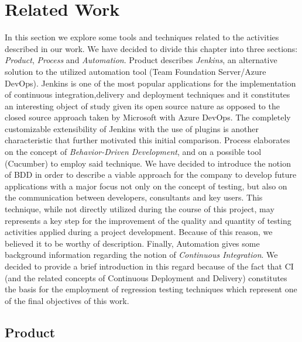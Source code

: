 \chapter{Related Work}

In this section we explore some tools and techniques related to the activities described in our work. We have decided to divide this chapter into three sections: \textit{Product}, \textit{Process} and \textit{Automation}. 
Product describes \textit{Jenkins}, an alternative solution to the utilized automation tool (Team Foundation Server/Azure DevOps). Jenkins is one of the most popular applications for the implementation of continuous integration,delivery and deployment techniques and it constitutes an interesting object of study given its open source nature as opposed to the closed source approach taken by Microsoft with Azure DevOps. The completely customizable extensibility of Jenkins with the use of plugins is another characteristic that further motivated this initial comparison. 
Process elaborates on the concept of \textit{Behavior-Driven Development}, and on a possible tool (Cucumber) to employ said technique. We have decided to introduce the notion of BDD in order to describe a viable approach for the company to develop future applications with a major focus not only on the concept of testing, but also on the communication between developers, consultants and key users. This technique, while not directly utilized during the course of this project, may represents a key step for the improvement of the quality and quantity of testing activities applied during a project development. Because of this reason, we believed it to be worthy of description. 
Finally, Automation gives some background information regarding the notion of \textit{Continuous Integration}. We decided to provide a brief introduction in this regard because of the fact that CI (and the related concepts of Continuous Deployment and Delivery) constitutes the basis for the employment of regression testing techniques which represent one of the final objectives of this work.

\section{Product} 

